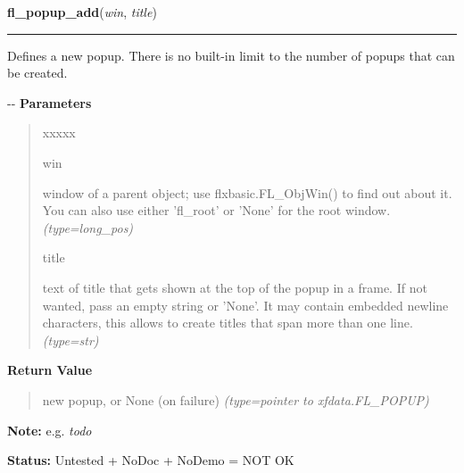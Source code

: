     \vspace{0.5ex}

\hspace{.8\funcindent}\begin{boxedminipage}{\funcwidth}

    \raggedright \textbf{fl\_popup\_add}(\textit{win}, \textit{title})

    \vspace{-1.5ex}

    \rule{\textwidth}{0.5\fboxrule}
\setlength{\parskip}{2ex}

Defines a new popup. There is no built-in limit to the number
of popups that can be created.

-{}-
\setlength{\parskip}{1ex}
      \textbf{Parameters}
      \vspace{-1ex}

      \begin{quote}
        \begin{Ventry}{xxxxx}

          \item[win]


window of a parent object; use flxbasic.FL\_ObjWin() to find out about
it. You can also use either 'fl\_root' or 'None' for the root window.
            {\it (type=long\_pos)}

          \item[title]


text of title that gets shown at the top of the popup in a frame. If
not wanted, pass an empty string or 'None'. It may contain embedded
newline characters, this allows to create titles that span more than
one line.
            {\it (type=str)}

        \end{Ventry}

      \end{quote}

      \textbf{Return Value}
    \vspace{-1ex}

      \begin{quote}

new popup, or None (on failure)
      {\it (type=pointer to xfdata.FL\_POPUP)}

      \end{quote}

\textbf{Note:} 
e.g. \emph{todo}


\textbf{Status:} 
Untested + NoDoc + NoDemo = NOT OK


    \end{boxedminipage}

